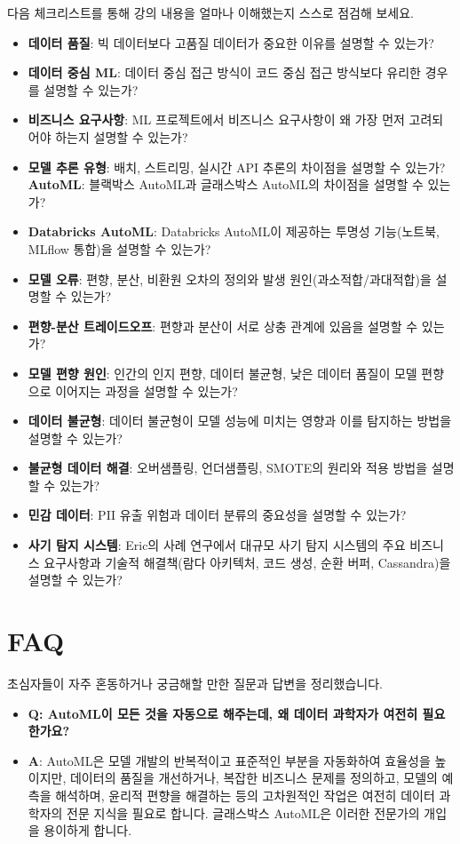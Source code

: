 \documentclass[11pt,a4paper]{article}
\theoremstyle{definition}
\begin{document}
\begin{itemize}
\begin{itemize}
\begin{itemize}
\begin{itemize}
\begin{itemize}
\begin{enumerate}
다음 체크리스트를 통해 강의 내용을 얼마나 이해했는지 스스로 점검해 보세요.

\begin{itemize}
    \item \textbf{데이터 품질}: 빅 데이터보다 고품질 데이터가 중요한 이유를 설명할 수 있는가?
    \item \textbf{데이터 중심 ML}: 데이터 중심 접근 방식이 코드 중심 접근 방식보다 유리한 경우를 설명할 수 있는가?
    \item \textbf{비즈니스 요구사항}: ML 프로젝트에서 비즈니스 요구사항이 왜 가장 먼저 고려되어야 하는지 설명할 수 있는가?
    \item \textbf{모델 추론 유형}: 배치, 스트리밍, 실시간 API 추론의 차이점을 설명할 수 있는가?
    \textbf{AutoML}: 블랙박스 AutoML과 글래스박스 AutoML의 차이점을 설명할 수 있는가?
    \item \textbf{Databricks AutoML}: Databricks AutoML이 제공하는 투명성 기능(노트북, MLflow 통합)을 설명할 수 있는가?
    \item \textbf{모델 오류}: 편향, 분산, 비환원 오차의 정의와 발생 원인(과소적합/과대적합)을 설명할 수 있는가?
    \item \textbf{편향-분산 트레이드오프}: 편향과 분산이 서로 상충 관계에 있음을 설명할 수 있는가?
    \item \textbf{모델 편향 원인}: 인간의 인지 편향, 데이터 불균형, 낮은 데이터 품질이 모델 편향으로 이어지는 과정을 설명할 수 있는가?
    \item \textbf{데이터 불균형}: 데이터 불균형이 모델 성능에 미치는 영향과 이를 탐지하는 방법을 설명할 수 있는가?
    \item \textbf{불균형 데이터 해결}: 오버샘플링, 언더샘플링, SMOTE의 원리와 적용 방법을 설명할 수 있는가?
    \item \textbf{민감 데이터}: PII 유출 위험과 데이터 분류의 중요성을 설명할 수 있는가?
    \item \textbf{사기 탐지 시스템}: Eric의 사례 연구에서 대규모 사기 탐지 시스템의 주요 비즈니스 요구사항과 기술적 해결책(람다 아키텍처, 코드 생성, 순환 버퍼, Cassandra)을 설명할 수 있는가?
\end{itemize}

\newpage
\section*{FAQ}

초심자들이 자주 혼동하거나 궁금해할 만한 질문과 답변을 정리했습니다.

\begin{itemize}
    \item \textbf{Q: AutoML이 모든 것을 자동으로 해주는데, 왜 데이터 과학자가 여전히 필요한가요?}
    \item \textbf{A}: AutoML은 모델 개발의 반복적이고 표준적인 부분을 자동화하여 효율성을 높이지만, 데이터의 품질을 개선하거나, 복잡한 비즈니스 문제를 정의하고, 모델의 예측을 해석하며, 윤리적 편향을 해결하는 등의 고차원적인 작업은 여전히 데이터 과학자의 전문 지식을 필요로 합니다. 글래스박스 AutoML은 이러한 전문가의 개입을 용이하게 합니다.


\end{itemize}
\end{enumerate}
\end{itemize}
\end{itemize}
\end{itemize}
\end{itemize}
\end{itemize}
\end{document}
